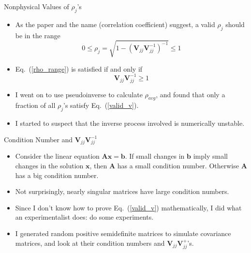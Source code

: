 \documentclass[aspectratio=169]{beamer}
\begin{document}
\begin{frame}{Nonphysical Values of $\rho_j$'s}
  \begin{itemize}
    \item As the paper and the name (correlation coefficient) suggest, a valid $\rho_j$ should be in the range
    \begin{equation}
      0\le \rho_j=\sqrt{1-\left(\mathbf{V}_{jj}\mathbf{V}^{-1}_{jj}\right)^{-1}} \le 1 \label{rho_range}
    \end{equation}
    \item Eq.~(\ref{rho_range}) is satisfied if and only if
    \begin{equation}
      \mathbf{V}_{jj}\mathbf{V}^{-1}_{jj} \ge 1 \label{valid_v}
    \end{equation}
    \item I went on to use pseudoinverse to calculate $\rho_{avg}$, and found that only a fraction of all $\rho_j$'s satisfy Eq.~(\ref{valid_v}).
    \item I started to suspect that the inverse process involved is numerically unstable.
  \end{itemize}
\end{frame}

\begin{frame}{Condition Number and $\mathbf{V}_{jj}\mathbf{V}^{-1}_{jj}$}
  \begin{itemize}
    \item Consider the linear equation $\mathbf{A}\mathbf{x}=\mathbf{b}$. If small changes in $\mathbf{b}$ imply small changes in the solution $\mathbf{x}$, then $\mathbf{A}$ has a small condition number. Otherwise $\mathbf{A}$ has a big condition number.
    \item Not surprisingly, nearly singular matrices have large condition numbers.
    \item Since I don't know how to prove Eq.~(\ref{valid_v}) mathematically, I did what an experimentalist does: do some experiments.
    \item I generated random positive semidefinite matrices to simulate covariance matrices, and look at their condition numbers and $\mathbf{V}_{jj}\mathbf{V}^{+}_{jj}$'s.
  \end{itemize}
\end{frame}
\end{document}
